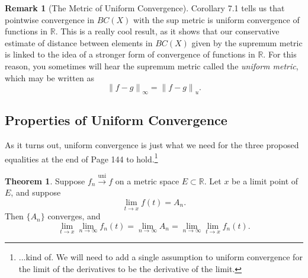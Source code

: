 \documentclass{article}
\newcommand{\R}{\mathbb{R}}
\newcommand{\norm}[1]{\left\lVert#1\right\rVert}
\newcommand{\uni}{\overset{\text{uni}}{\to}}
\theoremstyle{definition}
\newtheorem{theorem}{Theorem}[section]
\newtheorem{remark}{Remark}[section]
\begin{document}
\begin{remark}[The Metric of Uniform Convergence]
	Corollary 7.1 tells us that pointwise convergence in $ BC(X) $ with the sup metric is uniform convergence of functions in $ \R $. This is a really cool result, as it shows that our conservative estimate of distance between elements in $ BC(X) $ given by the supremum metric is linked to the idea of a stronger form of convergence of functions in $ \R $. For this reason, you sometimes will hear the supremum metric called the \textit{\color{red}uniform metric}, which may be written as $$ \norm{f-g}_\infty=\norm{f-g}_u.$$ 
\end{remark}

\subsection{Properties of Uniform Convergence}
As it turns out, uniform convergence is just what we need for the three proposed equalities at the end of Page 144 to hold.\footnote{...kind of. We will need to add a single assumption to uniform convergence for the limit of the derivatives to be the derivative of the limit.}
\begin{theorem}
	Suppose $ f_n\uni f $ on a metric space $ E\subset \R $. Let $ x $ be a limit point of $ E $, and suppose $$\lim\limits_{t\to x}f(t)=A_n .$$ Then $ \{A_n\} $ converges, and $$ \lim\limits_{t\to x}\lim\limits_{n\to\infty}f_n(t)=\lim\limits_{n\to\infty} A_n=\lim\limits_{n\to\infty} \lim\limits_{t\to x}f_n(t). $$
\end{theorem}
\end{document}
